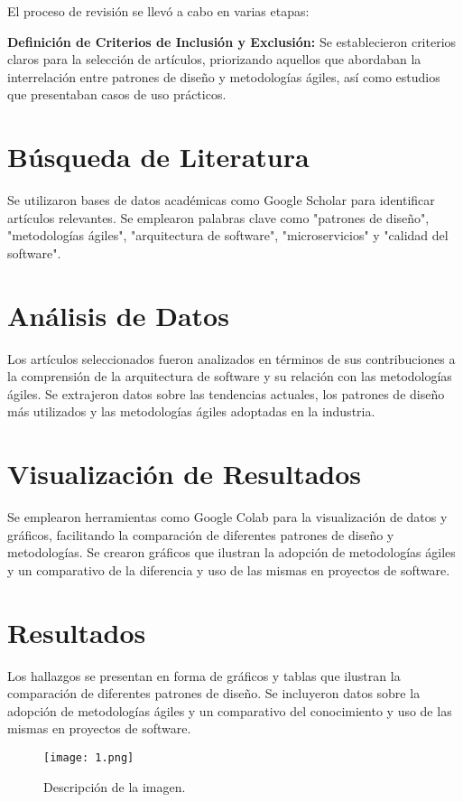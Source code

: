 \documentclass[twocolumn]{article}
\begin{document}
El proceso de revisión se llevó a cabo en varias etapas:

\textbf{Definición de Criterios de Inclusión y Exclusión:} Se establecieron criterios claros para la selección de artículos, priorizando aquellos que abordaban la interrelación entre patrones de diseño y metodologías ágiles, así como estudios que presentaban casos de uso prácticos.

\section{Búsqueda de Literatura}
Se utilizaron bases de datos académicas como Google Scholar para identificar artículos relevantes. Se emplearon palabras clave como "patrones de diseño", "metodologías ágiles", "arquitectura de software", "microservicios" y "calidad del software".

\section{Análisis de Datos}
Los artículos seleccionados fueron analizados en términos de sus contribuciones a la comprensión de la arquitectura de software y su relación con las metodologías ágiles. Se extrajeron datos sobre las tendencias actuales, los patrones de diseño más utilizados y las metodologías ágiles adoptadas en la industria.

\section{Visualización de Resultados}
Se emplearon herramientas como Google Colab para la visualización de datos y gráficos, facilitando la comparación de diferentes patrones de diseño y metodologías. Se crearon gráficos que ilustran la adopción de metodologías ágiles y un comparativo de la diferencia y uso de las mismas en proyectos de software.

\section{Resultados}
Los hallazgos se presentan en forma de gráficos y tablas que ilustran la comparación de diferentes patrones de diseño. Se incluyeron datos sobre la adopción de metodologías ágiles y un comparativo del conocimiento y uso de las mismas en proyectos de software.

\begin{figure}[h] %
    \centering %
    \texttt{[image: 1.png]} %
    \caption{Descripción de la imagen.} %
    \label{fig:mi_imagen} %
\end{figure}
\end{document}
